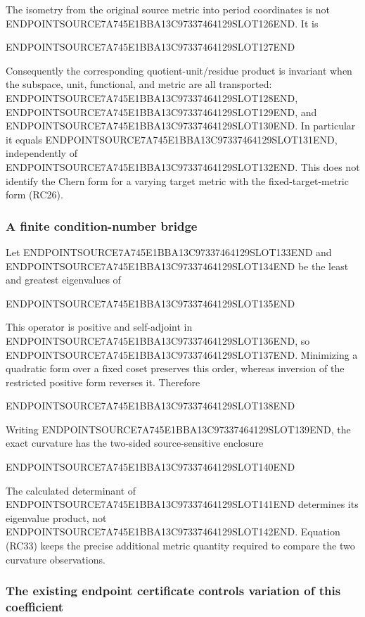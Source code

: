 The isometry from the original source metric into period coordinates is not ENDPOINTSOURCE7A745E1BBA13C97337464129SLOT126END. It is

ENDPOINTSOURCE7A745E1BBA13C97337464129SLOT127END

Consequently the corresponding quotient-unit/residue product is invariant when the subspace, unit, functional, and metric are all transported: ENDPOINTSOURCE7A745E1BBA13C97337464129SLOT128END, ENDPOINTSOURCE7A745E1BBA13C97337464129SLOT129END, and ENDPOINTSOURCE7A745E1BBA13C97337464129SLOT130END. In particular it equals ENDPOINTSOURCE7A745E1BBA13C97337464129SLOT131END, independently of ENDPOINTSOURCE7A745E1BBA13C97337464129SLOT132END. This does not identify the Chern form for a varying target metric with the fixed-target-metric form (RC26).

\subsubsection{A finite condition-number bridge}\label{endpoint-residue_original--a-finite-condition-number-bridge}

Let ENDPOINTSOURCE7A745E1BBA13C97337464129SLOT133END and ENDPOINTSOURCE7A745E1BBA13C97337464129SLOT134END be the least and greatest eigenvalues of

ENDPOINTSOURCE7A745E1BBA13C97337464129SLOT135END

This operator is positive and self-adjoint in ENDPOINTSOURCE7A745E1BBA13C97337464129SLOT136END, so ENDPOINTSOURCE7A745E1BBA13C97337464129SLOT137END. Minimizing a quadratic form over a fixed coset preserves this order, whereas inversion of the restricted positive form reverses it. Therefore

ENDPOINTSOURCE7A745E1BBA13C97337464129SLOT138END

Writing ENDPOINTSOURCE7A745E1BBA13C97337464129SLOT139END, the exact curvature has the two-sided source-sensitive enclosure

ENDPOINTSOURCE7A745E1BBA13C97337464129SLOT140END

The calculated determinant of ENDPOINTSOURCE7A745E1BBA13C97337464129SLOT141END determines its eigenvalue product, not ENDPOINTSOURCE7A745E1BBA13C97337464129SLOT142END. Equation (RC33) keeps the precise additional metric quantity required to compare the two curvature observations.

\subsubsection{The existing endpoint certificate controls variation of this coefficient}\label{endpoint-residue_original--the-existing-endpoint-certificate-controls-variation-of-this-coefficient}


